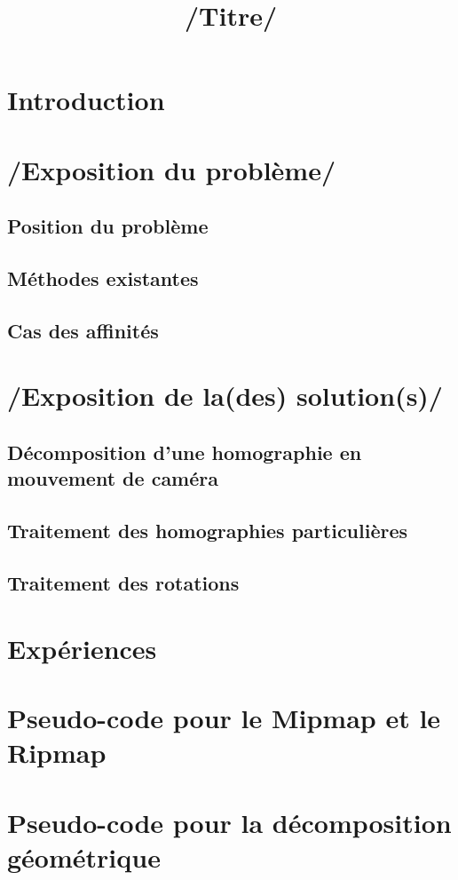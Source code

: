 \documentclass[a4paper,11pt]{article}
\title{/Titre/}
\begin{document}
   	\maketitle
	\tableofcontents
	
	\section*{Introduction}
		
	\section{/Exposition du problème/}
		\subsection{Position du problème}
		\subsection{Méthodes existantes}
		\subsection{Cas des affinités}
	\section{/Exposition de la(des) solution(s)/}
		\subsection{Décomposition d'une homographie en mouvement de caméra}
		\subsection{Traitement des homographies particulières}
			
		\subsection{Traitement des rotations}
	\section{Expériences}
		
	\appendix
	\section{Pseudo-code pour le Mipmap et le Ripmap}
	\section{Pseudo-code pour la décomposition géométrique}
	\nocite{*}
	
	
\end{document}
